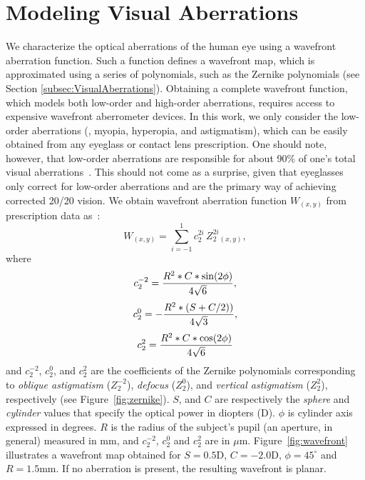 
\section{Modeling Visual Aberrations}
\label{sec:SpecifyingAberrations}

We characterize the optical aberrations of the human eye using a wavefront aberration function. Such a function defines a wavefront map, which is approximated using a series of polynomials, such as the Zernike polynomials (see Section \ref{subsec:VisualAberrations}). 
Obtaining a complete wavefront function, which models both low-order and high-order aberrations, requires access to expensive wavefront aberrometer devices. In this work, we only consider the low-order aberrations (\ie, myopia, hyperopia, and astigmatism), which can be easily obtained from any eyeglass or contact lens prescription. One should note, however, that low-order aberrations are responsible for about 90\% of one's total visual aberrations~\cite{Dias2014}. This should not come as a surprise, given that eyeglasses only correct for low-order aberrations and are the primary way of achieving corrected 20/20 vision. 
We obtain wavefront aberration function $W_{(x,y)}$ from prescription data as~\cite{Dai2008}:
\begin{equation}
	\label{eq:W}
  W_{(x,y)} = \sum_{i=-1}^1 c_{2}^{2i} \, Z_{2}^{2i}_{(x,y)},
\end{equation}
where
\begin{equation}
	\centering
	\label{eq:c2-2}
	c^{-2}_{2} = \frac{R^2*C*\sin(2\phi )}{4\sqrt{6}},
\end{equation}
%
\begin{equation}
	\centering
	\label{eq:c20}
	c^{0}_{2} = - \frac{R^2 * (S + C/2))}{4\sqrt{3}}, 
\end{equation}
%
\begin{equation}
	\centering
	\label{eq:c22}
	c^{2}_{2} = \frac{R^2*C*\cos(2\phi )}{4\sqrt{6}}
\end{equation}
\noindent
and 
$c^{-2}_{2}$, $c^{0}_{2}$, and $c^{2}_{2}$ are the coefficients of the Zernike polynomials corresponding to {\it oblique astigmatism} ($Z^{-2}_{2}$), {\it defocus} ($Z^{0}_{2}$), and {\it vertical astigmatism} ($Z^{2}_{2}$), respectively (see Figure~\ref{fig:zernike}).
$S$, and $C$ are respectively the {\it sphere} and {\it cylinder} values that specify the optical power in diopters (D).  $\phi$ is cylinder axis expressed in degrees. 
$R$ is the radius of the subject's pupil (an aperture, in general)  measured in mm, and $c^{-2}_{2}$, $c^{0}_{2}$ and $c^{2}_{2}$ are in $\mu$m. Figure~\ref{fig:wavefront} illustrates a wavefront map obtained for $S = 0.5$D, $C = -2.0$D, $\phi = 45^\circ$ and $R = 1.5$mm. If no aberration is present, the resulting wavefront is planar.


